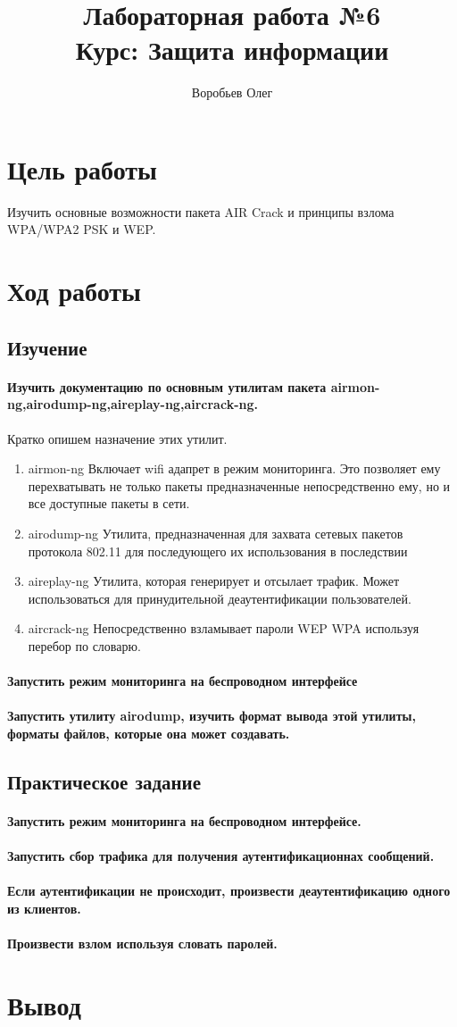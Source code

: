 \documentclass{article}
\title{Лабораторная работа №6 \\ Курс: Защита информации}
\author{Воробьев Олег}
\begin{document}
\section{Цель работы}
Изучить основные возможности пакета AIR Crack и принципы взлома WPA/WPA2 PSK и WEP.
\section{Ход работы}
\subsection{Изучение}
\paragraph{Изучить документацию по основным утилитам пакета airmon-ng,airodump-ng,aireplay-ng,aircrack-ng.\\}

Кратко опишем назначение этих утилит.
\begin{enumerate}
	\item airmon-ng Включает wifi адапрет в режим мониторинга. Это позволяет ему перехватывать не только пакеты предназначенные непосредственно ему, но и все доступные пакеты в сети. 
	\item airodump-ng Утилита, предназначенная для захвата сетевых пакетов протокола 802.11 для последующего их использования в последствии
	\item aireplay-ng Утилита, которая генерирует и отсылает трафик. Может использоваться для принудительной деаутентификации пользователей.
	\item aircrack-ng Непосредственно взламывает пароли WEP WPA используя перебор по словарю.
\end{enumerate}

\paragraph{Запустить режим мониторинга на беспроводном интерфейсе}
\paragraph{Запустить утилиту airodump, изучить формат вывода этой утилиты, форматы файлов, которые она может создавать.}
\subsection{Практическое задание}
\paragraph{Запустить режим мониторинга на беспроводном интерфейсе.}
\paragraph{Запустить сбор трафика для получения аутентификационнах сообщений.}
\paragraph{Если аутентификации не происходит, произвести деаутентификацию одного из клиентов.}
\paragraph{Произвести взлом используя словать паролей.}
\section{Вывод}
	
\end{document}
